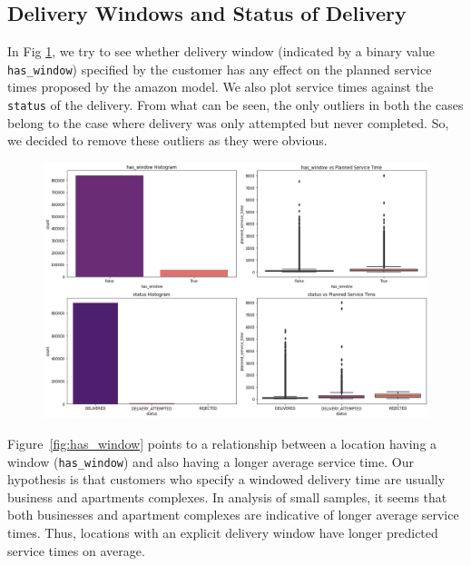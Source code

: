 \documentclass[12pt]{article}
\theoremstyle{plain}
\numberwithin{equation}{section}
\begin{document}
\subsection{Delivery Windows and Status of Delivery}
In Fig \ref{fig:window_and_status}, we try to see whether delivery window (indicated by a binary value \texttt{has\_window}) specified by the customer has any effect on the planned service times proposed by the amazon model. We also plot service times against the \texttt{status} of the delivery. From what can be seen, the only outliers in both the cases belong to the case where delivery was only attempted but never completed. So, we decided to remove these outliers as they were obvious.

\begin{figure}[h!]
\centering
\includegraphics[width=14cm]{Images/window_and_status.png}
\caption{}
\label{fig:window_and_status}
\end{figure}

Figure~\ref{fig:has_window} points to a relationship between a location having a window (\texttt{has\_window}) and also having a longer average service time. Our hypothesis is that customers who specify a windowed delivery time are usually business and apartments complexes. In analysis of small samples, it seems that both businesses and apartment complexes are indicative of longer average service times. Thus, locations with an explicit delivery window have longer predicted service times on average.
\end{document}
